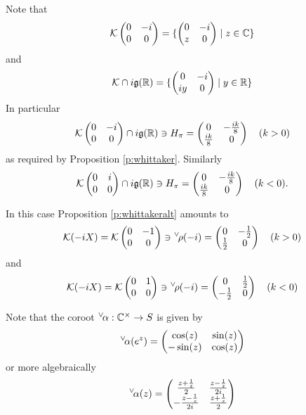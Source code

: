 \documentclass{article}
\theoremstyle{definition}
\numberwithin{equation}{section}
\renewcommand{\-}{\hyp{}}
\newcommand{\g}{\mathfrak g}
\newcommand{\K}{\mathcal K}
\newcommand{\ch}[1]{\negthinspace\negthinspace\negthinspace\phantom{a}^\vee\negthinspace #1}
\begin{document}
Note that
$$
\K
\begin{pmatrix}0&-i\\0&0
\end{pmatrix}=\{\begin{pmatrix}0&-i\\z&0
\end{pmatrix}\mid z\in\C\}
$$
and
$$
\K\cap i\g(\R)=
\{\begin{pmatrix}0&-i\\iy&0
\end{pmatrix}\mid y\in\R\}
$$
In particular
$$
\K\begin{pmatrix}0&-i\\0&0\end{pmatrix}\cap i\g(\R)\ni H_\pi=\begin{pmatrix}0&-\frac{ik}8\\\frac{ik}8&0\end{pmatrix}\quad (k>0)
$$
as required by Proposition \ref{p:whittaker}.
Similarly
$$
\K\begin{pmatrix}0&i\\0&0\end{pmatrix}\cap i\g(\R)\ni H_\pi=\begin{pmatrix}0&-\frac{ik}8\\\frac{ik}8&0\end{pmatrix}\quad (k<0).
$$

In this case Proposition \ref{p:whittakeralt} amounts to 
$$
\K(-iX)=\K\begin{pmatrix}0&-1\\0&0
\end{pmatrix}\ni \ch\rho(-i)=
\begin{pmatrix}
  0&-\frac 12\\\frac 12&0
\end{pmatrix}\quad (k>0)
$$
and
$$
\K(-iX)=\K\begin{pmatrix}0&1\\0&0
\end{pmatrix}\ni \ch\rho(-i)=
\begin{pmatrix}
  0&\frac 12\\-\frac 12&0
\end{pmatrix}\quad (k<0)
$$

Note that the coroot $\ch\alpha:\C^\times \rightarrow S$ is given by
$$
\ch\alpha(e^z)=\begin{pmatrix}\cos(z)&\sin(z)\\-\sin(z)&\cos(z)
\end{pmatrix}
$$
or more algebraically
$$
\ch\alpha(z)=\begin{pmatrix}
\frac{z+\frac 1z}2&\frac{z-\frac 1z}{2i}\\
-\frac{z-\frac 1z}{2i}&\frac{z+\frac 1z}2
\end{pmatrix}
$$
\end{document}
